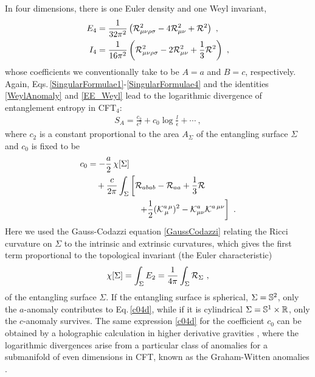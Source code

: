 In four dimensions, there is one Euler density and one Weyl invariant,
\begin{align}
\begin{aligned}
E_4 &= \frac{1}{32\pi^2} \left( {\cal R}_{\mu\nu\rho\sigma}^2 - 4 {\cal R}_{\mu\nu}^2 + {\cal R}^2 \right) \ , \\
I_4 &= \frac{1}{16\pi^2} \left( {\cal R}_{\mu\nu\rho\sigma}^2 - 2 {\cal R}_{\mu\nu}^2 + \frac{1}{3}{\cal R}^2 \right) \ ,
\end{aligned}
\end{align}
whose coefficients we conventionally take to be $A = a$ and $B=c$, respectively.
Again, Eqs.\,\eqref{SingularFormulae1}-\eqref{SingularFormulae4} and the identities \eqref{WeylAnomaly} and \eqref{EE_Weyl} lead to the logarithmic divergence of entanglement entropy in CFT$_4$:
\begin{align}\label{EE_4d}
S_A = \frac{c_2}{\epsilon^2} + c_0\log \frac{l}{\epsilon}  + \cdots \ ,
\end{align}
where $c_2$ is a constant proportional to the area $A_\Sigma$ of the entangling surface $\Sigma$ and $c_0$ is fixed to be \cite{Solodukhin:2008dh,Fursaev:2013fta}
\begin{align}\label{c04d}
\begin{aligned}
c_0 &=-\frac{a}{2}\, \chi [\Sigma ]\\
	&\quad  + \frac{c}{2\pi} \int_\Sigma \left[ {\cal R}_{abab} - {\cal R}_{aa} + \frac{1}{3}{\cal R} \right.\\
		&\qquad\qquad\qquad \left. + \frac{1}{2} ({\cal K}^{a\,\mu}_{\,\mu})^2 - {\cal K}^a_{\mu\nu} {\cal K}^{a\,\mu\nu}\right] \ .
\end{aligned}
\end{align}
Here we used the Gauss-Codazzi equation \eqref{GaussCodazzi} relating the Ricci curvature on $\Sigma$ to the intrinsic and extrinsic curvatures,
which gives the first term proportional to the topological invariant (the Euler characteristic)
\begin{align}
	\chi[\Sigma]= \int_\Sigma E_2 = \frac{1}{4\pi}\int_\Sigma {\cal R}_\Sigma \ ,
\end{align}
of the entangling surface $\Sigma$.
If the entangling surface is spherical, $\Sigma = \mathbb{S}^2$, only the $a$-anomaly contributes to Eq.\,\eqref{c04d}, while if it is cylindrical $\Sigma = \mathbb{S}^1 \times \mathbb{R}$, only the $c$-anomaly survives.
The same expression \eqref{c04d} for the coefficient $c_0$ can be obtained by a holographic calculation in higher derivative gravities \cite{Hung:2011xb}, where the logarithmic divergences arise from a particular class of anomalies for a submanifold of even dimensions in CFT, known as the Graham-Witten anomalies \cite{Graham:1999pm}.


